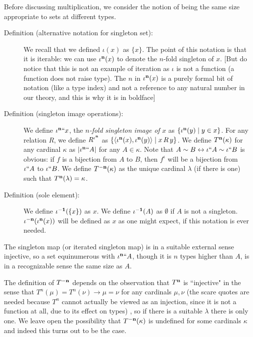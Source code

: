 \documentclass[12pt]{book}
\begin{document}
Before discussing multiplication, we consider the notion of being the
same size appropriate to sets at different types.

\begin{description}

\item[Definition (alternative notation for singleton set):] We recall that we defined
$\iota(x)$ as $\{x\}$.  The point of this notation is that it is
iterable: we can use $\iota^{\bf n}(x)$ to denote the $n$-fold
singleton of $x$.  [But do notice that this is not an example of
iteration as $\iota$ is not a function (a function does not raise
type).  The $n$ in $\iota^{\bf n}(x)$ is a purely formal bit of
notation (like a type index) and not a reference to any natural number
in our theory, and this is why it is in boldface]

\item[Definition (singleton image operations):] We define $\iota^{\bf n}``x$, the {\em $n$-fold singleton
image of $x$\/} as $\{\iota^{\bf n}(y)\mid y \in x\}$.  For any relation
$R$, we define $R^{\iota^{\bf n}}$ as
$\{\left<\iota^{\bf n}(x),\iota^{\bf n}(y)\right>\mid x\,R\,y\}$.  We define
$T^{\bf n}(\kappa)$ for any cardinal $\kappa$ as $|\iota^{\bf n}``A|$ for any $A
\in \kappa$.  Note that $A \sim B \leftrightarrow \iota``A \sim
\iota``B$ is obvious: if $f$ is a bijection from $A$ to $B$, then
$f^{\iota}$ will be a bijection from $\iota``A$ to $\iota``B$.  We
define $T^{\bf -n}(\kappa)$ as the unique cardinal $\lambda$ (if there is
one) such that $T^{\bf n}(\lambda)=\kappa$.

\item[Definition (sole element):] We define $\iota^{\bf -1}(\{x\})$ as $x$.  We define
$\iota^{\bf -1}(A)$ as $\emptyset$ if $A$ is not a singleton.
$\iota^{\bf -n}(\iota^{\bf n}(x))$ will be defined as $x$ as one might expect,
if this notation is ever needed.  

\end{description}

The singleton map (or iterated singleton map) is in a suitable
external sense injective, so a set equinumerous with $\iota^{\bf n}``A$,
though it is $n$ types higher than $A$, is in a recognizable sense the
same size as $A$.

The definition of $T^{\bf -n}$ depends on the observation that $T^{\bf n}$ is 
 ``injective" in the sense that $T^n(\mu)=T^n(\nu)\rightarrow \mu=\nu$ for any cardinals $\mu,\nu$ (the scare quotes are needed because $T^n$ cannot actually be viewed as an injection, since it is not a function at all, due to its effect on types) , so if there is a suitable $\lambda$ there is only one.  We
leave open the possibility that $T^{\bf -n}(\kappa)$ is undefined for some
cardinals $\kappa$ and indeed this turns out to be the case.
\end{document}
